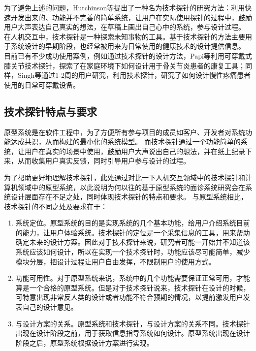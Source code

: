 为了避免上述的问题，Hutchinson等\cite{Hutchinson2003Technology}提出了一种名为技术探针的研究方法：利用快速开发出来的、功能并不完善的简单系统，让用户在实际使用探针的过程中，鼓励用户大声表达自己真实的想法，在草稿上画出自己心中的系统，参与设计过程。
在人机交互中，技术探针是一种探索未知事物的工具。基于技术探针的方法主要用于系统设计的早期阶段\cite{turmo2020training}，也经常被用来为日常使用的健康技术的设计提供信息。
目前已有不少成功使用案例，例如通过技术探针的设计方法，Papi等\cite{papi2015knee}利用可穿戴式膝关节技术探针，探索了在家庭环境下如何设计用于骨关节炎患者的康复工具；同样，Singh等\cite{singh2017supporting}通过1-2周的用户研究，利用技术探针，研究了如何设计慢性疼痛患者使用的日常可穿戴设备。

\subsection{技术探针特点与要求}

原型系统是在软件工程中，为了方便所有参与项目的成员如客户、开发者对系统功能达成共识，从而构建的最小化的系统模型。
而技术探针通过一个功能简单的系统，让用户在真实的场景中使用，鼓励用户大声说出自己的想法，并在纸上纪录下来，从而收集用户真实反馈，同时引导用户参与设计的过程。

为了帮助更好地理解技术探针，此处通过对比一下人机交互领域中的技术探针和计算机领域中的原型系统，以此说明为何以往的基于原型系统的面诊系统研究会在系统设计层面存在不足之处，同时体现技术探针的特点和要求。
与原型系统相比，技术探针的不同之处及要求在于：
\begin{enumerate}
    \item 系统定位。原型系统的目的是实现系统的几个基本功能，给用户介绍系统目前的能力，让用户体验系统。技术探针的定位是一个采集信息的工具，用来帮助确定未来的设计方案。因此对于技术探针来说，研究者可能一开始并不知道该系统应该如何设计，所以在实现一个技术探针时，功能应该尽可能简单，减少模块分层，把设计过程让用户自由发挥，不限制用户的使用方式。

    \item 功能可用性。对于原型系统来说，系统中的几个功能需要保证正常可用，才能算是一个合格的原型系统。但是对于技术探针说来，技术探针在设计的时候，可特意出现非常反人类的设计或者功能不符合预期的情况，以提前激发用户发表自己的设计意见。

    \item 与设计方案的关系。原型系统和技术探针，与设计方案的关系不同。技术探针出现在设计阶段之前，用于获取信息指导系统如何设计。原型系统出现在设计阶段之后，原型系统根据设计方案进行实现。
\end{enumerate}

